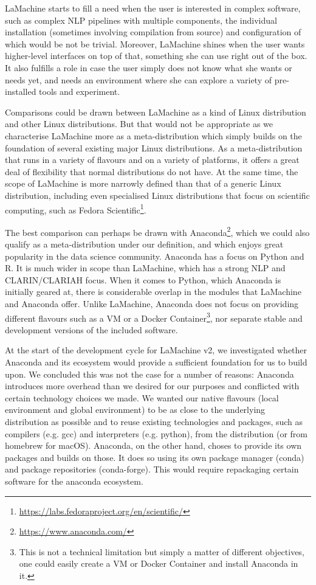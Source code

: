 \documentclass[a4paper,11pt]{article}
\begin{document}
LaMachine starts to fill a need when the user is interested in complex software, such as complex NLP pipelines with
multiple components, the individual installation (sometimes involving compilation from source) and configuration of
which would be not be trivial. Moreover, LaMachine shines when the user wants higher-level interfaces on top of that,
something she can use right out of the box. It also fulfills a role in case the user simply does not know what she wants
or needs yet, and needs an environment where she can explore a variety of pre-installed tools and experiment.

Comparisons could be drawn between LaMachine as a kind of Linux distribution and other Linux distributions. But that
would not be appropriate as we characterise LaMachine more as a meta-distribution which simply builds on the foundation
of several existing major Linux distributions. As a meta-distribution that runs in a variety of flavours and on a
variety of platforms, it offers a great deal of flexibility that normal distributions do not have. At the same time, the scope of
LaMachine is more narrowly defined than that of a generic Linux distribution, including even specialised Linux
distributions that focus on scientific computing, such as Fedora
Scientific\footnote{\url{https://labs.fedoraproject.org/en/scientific/}}.

The best comparison can perhaps be drawn with Anaconda\footnote{\url{https://www.anaconda.com/}}, which we could also qualify as
a meta-distribution under our definition, and which enjoys great popularity in the data science community. Anaconda has
a focus on Python and R. It is much wider in scope than LaMachine, which has a strong NLP and CLARIN/CLARIAH focus. When
it comes to Python, which Anaconda is initially geared at, there is considerable overlap in the modules that LaMachine and Anaconda offer. Unlike LaMachine,
Anaconda does not focus on providing different flavours such as a VM or a Docker Container\footnote{This is not a
technical limitation but simply a matter of different objectives, one could easily create a VM or Docker Container and
install Anaconda in it.}, nor separate stable and development versions of the included software.

At the start of the development cycle for LaMachine v2, we investigated whether Anaconda and its ecosystem would provide
a sufficient foundation for us to build upon. We concluded this was not the case for a number of reasons: Anaconda
introduces more overhead than we desired for our purposes and conflicted with certain technology choices we made. We
wanted our native flavours (local environment and global environment) to be as close to the underlying distribution as possible and to reuse existing
technologies and packages, such as compilers (e.g. gcc) and
interpreters (e.g. python), from the distribution (or from homebrew for macOS).  Anaconda, on the other hand, choses to provide its own packages and builds on those. It
does so using its own package manager (conda) and package repositories (conda-forge). This would require repackaging certain software for the
anaconda ecosystem.
\end{document}
